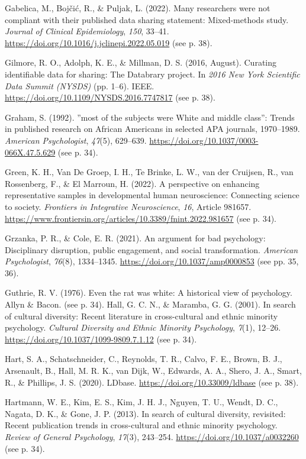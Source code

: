 \documentclass[authordate, empirical,issue]{jote-new-article}
\begin{document}
Gabelica, M., Bojčić, R., \& Puljak, L. (2022). Many researchers were not compliant with their published data sharing statement: Mixed-methods study. \emph{Journal of Clinical Epidemiology}, \emph{150}, 33–41. \url{https://doi.org/10.1016/j.jclinepi.2022.05.019} (see p. 38).

Gilmore, R. O., Adolph, K. E., \& Millman, D. S. (2016, August). Curating identifiable data for sharing: The Databrary project. In \emph{2016 New York Scientific Data Summit (NYSDS)} (pp. 1–6). IEEE. \url{https://doi.org/10.1109/NYSDS.2016.7747817} (see p. 38).

Graham, S. (1992). ”most of the subjects were White and middle class”: Trends in published research on African Americans in selected APA journals, 1970–1989. \emph{American Psychologist}, \emph{47}(5), 629–639. \url{https://doi.org/10.1037/0003-066X.47.5.629} (see p. 34).

Green, K. H., Van De Groep, I. H., Te Brinke, L. W., van der Cruijsen, R., van Rossenberg, F., \& El Marroun, H. (2022). A perspective on enhancing representative samples in developmental human neuroscience: Connecting science to society. \emph{Frontiers in Integrative Neuroscience}, \emph{16}, Article 981657. \url{https://www.frontiersin.org/articles/10.3389/fnint.2022.981657} (see p. 34).

Grzanka, P. R., \& Cole, E. R. (2021). An argument for bad psychology: Disciplinary disruption, public engagement, and social transformation. \emph{American Psychologist}, \emph{76}(8), 1334–1345. \url{https://doi.org/10.1037/amp0000853} (see pp. 35, 36).

Guthrie, R. V. (1976). Even the rat was white: A historical view of psychology. Allyn \& Bacon. (see p. 34). Hall, G. C. N., \& Maramba, G. G. (2001). In search of cultural diversity: Recent literature in cross-cultural and ethnic minority psychology. \emph{Cultural Diversity and Ethnic Minority Psychology}, \emph{7}(1), 12–26. \url{https://doi.org/10.1037/1099-9809.7.1.12} (see p. 34).

Hart, S. A., Schatschneider, C., Reynolds, T. R., Calvo, F. E., Brown, B. J., Arsenault, B., Hall, M. R. K., van Dijk, W., Edwards, A. A., Shero, J. A., Smart, R., \& Phillips, J. S. (2020). LDbase. \url{https://doi.org/10.33009/ldbase} (see p. 38).

Hartmann, W. E., Kim, E. S., Kim, J. H. J., Nguyen, T. U., Wendt, D. C., Nagata, D. K., \& Gone, J. P. (2013). In search of cultural diversity, revisited: Recent publication trends in cross-cultural and ethnic minority psychology. \emph{Review of General Psychology}, \emph{17}(3), 243–254. \url{https://doi.org/10.1037/a0032260} (see p. 34).
\end{document}
